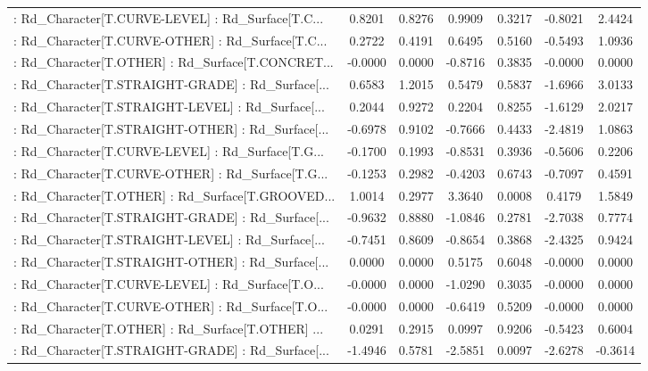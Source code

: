\begin{longtable}{p{4cm}cccccc}
 : Rd\_Character[T.CURVE-LEVEL] : Rd\_Surface[T.C... &  0.8201 &    0.8276 &  0.9909 &       0.3217 & -0.8021 &  2.4424 \\
 : Rd\_Character[T.CURVE-OTHER] : Rd\_Surface[T.C... &  0.2722 &    0.4191 &  0.6495 &       0.5160 & -0.5493 &  1.0936 \\
 : Rd\_Character[T.OTHER] : Rd\_Surface[T.CONCRET... & -0.0000 &    0.0000 & -0.8716 &       0.3835 & -0.0000 &  0.0000 \\
 : Rd\_Character[T.STRAIGHT-GRADE] : Rd\_Surface[... &  0.6583 &    1.2015 &  0.5479 &       0.5837 & -1.6966 &  3.0133 \\
 : Rd\_Character[T.STRAIGHT-LEVEL] : Rd\_Surface[... &  0.2044 &    0.9272 &  0.2204 &       0.8255 & -1.6129 &  2.0217 \\
 : Rd\_Character[T.STRAIGHT-OTHER] : Rd\_Surface[... & -0.6978 &    0.9102 & -0.7666 &       0.4433 & -2.4819 &  1.0863 \\
 : Rd\_Character[T.CURVE-LEVEL] : Rd\_Surface[T.G... & -0.1700 &    0.1993 & -0.8531 &       0.3936 & -0.5606 &  0.2206 \\
 : Rd\_Character[T.CURVE-OTHER] : Rd\_Surface[T.G... & -0.1253 &    0.2982 & -0.4203 &       0.6743 & -0.7097 &  0.4591 \\
 : Rd\_Character[T.OTHER] : Rd\_Surface[T.GROOVED... &  1.0014 &    0.2977 &  3.3640 &       0.0008 &  0.4179 &  1.5849 \\
 : Rd\_Character[T.STRAIGHT-GRADE] : Rd\_Surface[... & -0.9632 &    0.8880 & -1.0846 &       0.2781 & -2.7038 &  0.7774 \\
 : Rd\_Character[T.STRAIGHT-LEVEL] : Rd\_Surface[... & -0.7451 &    0.8609 & -0.8654 &       0.3868 & -2.4325 &  0.9424 \\
 : Rd\_Character[T.STRAIGHT-OTHER] : Rd\_Surface[... &  0.0000 &    0.0000 &  0.5175 &       0.6048 & -0.0000 &  0.0000 \\
 : Rd\_Character[T.CURVE-LEVEL] : Rd\_Surface[T.O... & -0.0000 &    0.0000 & -1.0290 &       0.3035 & -0.0000 &  0.0000 \\
 : Rd\_Character[T.CURVE-OTHER] : Rd\_Surface[T.O... & -0.0000 &    0.0000 & -0.6419 &       0.5209 & -0.0000 &  0.0000 \\
 : Rd\_Character[T.OTHER] : Rd\_Surface[T.OTHER] ... &  0.0291 &    0.2915 &  0.0997 &       0.9206 & -0.5423 &  0.6004 \\
 : Rd\_Character[T.STRAIGHT-GRADE] : Rd\_Surface[... & -1.4946 &    0.5781 & -2.5851 &       0.0097 & -2.6278 & -0.3614 \\

\end{longtable}
